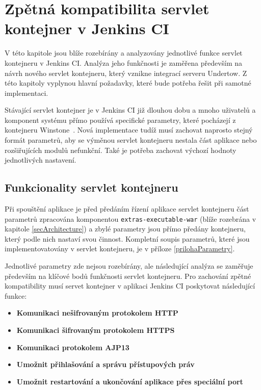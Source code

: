  


    \section{Zpětná kompatibilita servlet kontejner v Jenkins CI}
        V této kapitole jsou blíže rozebírány a analyzovány jednotlivé funkce servlet
        kontejneru v Jenkins CI. Analýza jeho funkčnosti je zaměřena především na 
        návrh nového servlet kontejneru, který vznikne integrací serveru Undertow.
        Z této kapitoly vyplynou hlavní požadavky, které bude potřeba řešit 
        při samotné implementaci.

        Stávající servlet kontejner je v Jenkins CI již dlouhou dobu a 
        mnoho uživatelů a komponent systému přímo používá specifické
        parametry, které pocházejí z kontejneru Winstone~\cite{kohsukeTopic}. Nová implementace
        tudíž musí zachovat naprosto stejný formát parametrů, aby 
        se výměnou servlet kontejneru nestala část aplikace nebo rozšiřujících modulů nefunkční.
        Také je potřeba zachovat výchozí hodnoty jednotlivých nastavení.

        \subsection{Funkcionality servlet kontejneru}
            Při spouštění aplikace je před předáním řízení aplikace servlet kontejneru
            část parametrů zpracována komponentou \texttt{extras-executable-war} (blíže 
            rozebrána v kapitole \ref{secArchitecture}) a zbylé parametry jsou přímo
            předány kontejneru, který podle nich nastaví svou činnost. Kompletní
            soupis parametrů, které jsou implementovatovány v servlet kontejneru,
            je v příloze \ref{prilohaParametry}.

            Jednotlivé parametry zde nejsou rozebírány, ale následující analýza
            se zaměřuje především na klíčové bodů funkčnosti servlet kontejneru.
            Pro zachování zpětné kompatibility musí servet kontejner v aplikaci 
            Jenkins CI poskytovat následující funkce:

            \begin{itemize}
                \item{\textbf{Komunikaci nešifrovaným protokolem HTTP}}
                \item{\textbf{Komunikaci šifrovaným protokolem HTTPS}}
                \item{\textbf{Komunikaci protokolem AJP13}} 
                \item{\textbf{Umožnit přihlašování a správu přístupových práv} }
                \item{\textbf{Umožnit restartování a ukončování aplikace přes speciální port}}
            \end{itemize}

